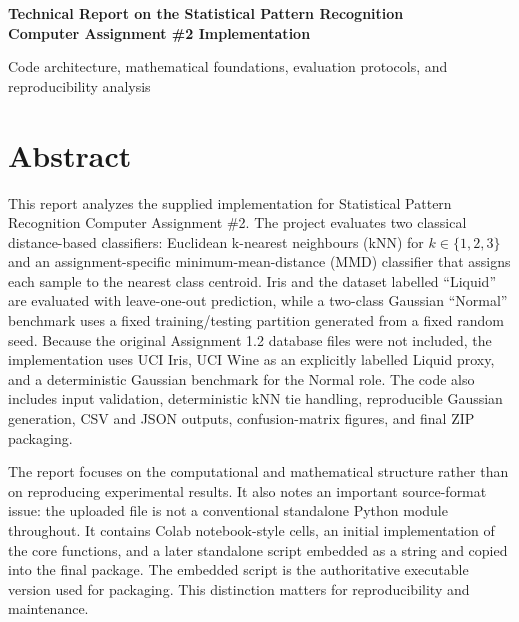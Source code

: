 \documentclass[11pt,a4paper]{article}
\begin{document}
\begin{titlepage}
\thispagestyle{empty}
\centering
\vspace*{3.2cm}
{\LARGE\bfseries Technical Report on the Statistical Pattern Recognition\\[0.35em] Computer Assignment \#2 Implementation\par}
\vspace{1.2cm}
{\large Code architecture, mathematical foundations, evaluation protocols, and reproducibility analysis\par}
\vfill
\begin{minipage}{0.86\textwidth}
\small

\end{minipage}
\vspace{1.8cm}
\end{titlepage}

\section*{Abstract}

This report analyzes the supplied implementation for Statistical Pattern Recognition Computer Assignment \#2. The project evaluates two classical distance-based classifiers: Euclidean k-nearest neighbours (kNN) for $k\in\{1,2,3\}$ and an assignment-specific minimum-mean-distance (MMD) classifier that assigns each sample to the nearest class centroid. Iris and the dataset labelled ``Liquid'' are evaluated with leave-one-out prediction, while a two-class Gaussian ``Normal'' benchmark uses a fixed training/testing partition generated from a fixed random seed. Because the original Assignment 1.2 database files were not included, the implementation uses UCI Iris, UCI Wine as an explicitly labelled Liquid proxy, and a deterministic Gaussian benchmark for the Normal role. The code also includes input validation, deterministic kNN tie handling, reproducible Gaussian generation, CSV and JSON outputs, confusion-matrix figures, and final ZIP packaging.

The report focuses on the computational and mathematical structure rather than on reproducing experimental results. It also notes an important source-format issue: the uploaded file is not a conventional standalone Python module throughout. It contains Colab notebook-style cells, an initial implementation of the core functions, and a later standalone script embedded as a string and copied into the final package. The embedded script is the authoritative executable version used for packaging. This distinction matters for reproducibility and maintenance.
\end{document}
